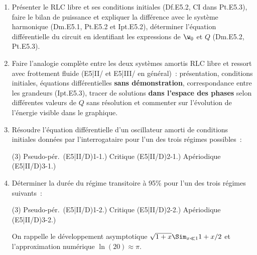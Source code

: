 \documentclass[a4paper, 11pt, final, garamond]{book}
\begin{document}
\begin{enumerate}
	\item Présenter le RLC libre et ses conditions initiales (Df.E5.2, CI dans
	      Pt.E5.3), faire le bilan de puissance et expliquer la différence avec le
	      système harmonique (Dm.E5.1, Pt.E5.2 et Ipt.E5.2), déterminer l'équation
	      différentielle du circuit en identifiant les expressions de $\w_0$ et $Q$
	      (Dm.E5.2, Pt.E5.3).

	\item Faire l'analogie complète entre les deux systèmes amortis RLC libre et
	      ressort avec frottement fluide (E5|II/ et E5|III/ en général)~:
	      présentation, conditions initiales, équations différentielles \textbf{sans
		      démonstration}, correspondance entre les grandeurs (Ipt.E5.3), tracer
	      de solutions \textbf{dans l'espace des phases} selon différentes
	      valeurs de $Q$ sans résolution et commenter sur l'évolution de
	      l'énergie visible dans le graphique.

	\item Résoudre l'équation différentielle d'un oscillateur amorti de conditions
	      initiales données par l'interrogataire pour l'un des trois régimes
	      possibles~:
	      \begin{tasks}[label=\protect\fbox{\Alph*}, label-width=4ex](3)
		      \task Pseudo-pér.\
		      (E5|II/D)1-1.)
		      \task Critique
		      (E5|II/D)2-1.)
		      \task Apériodique
		      (E5|II/D)3-1.)
	      \end{tasks}

	\item Déterminer la durée du régime transitoire à 95\% pour l'un des trois
	      régimes suivants~:
	      \begin{tasks}[label=\protect\fbox{\Alph*}, label-width=4ex](3)
		      \task {}
		      Pseudo-pér.\
		      (E5|II/D)1-2.)
		      \task {}
		      Critique
		      (E5|II/D)2-2.)
		      \task {}
		      Apériodique
		      (E5|II/D)3-2.)
	      \end{tasks}
	      On rappelle le développement asymptotique $\sqrt{1+x} \Sim_{x \ll 1}
		      1+x/2$ et l'approximation numérique $\ln (20) \approx \pi$.
\end{enumerate}
\end{document}
